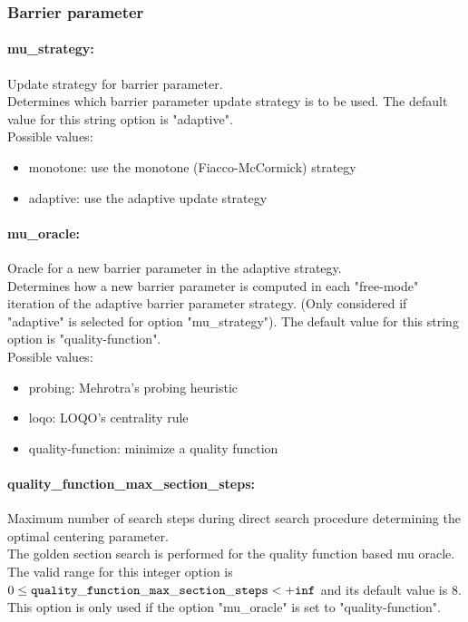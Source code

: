 \subsubsection{Barrier parameter}

\paragraph{mu\_strategy:} Update strategy for barrier parameter. $\;$ \\
 Determines which barrier parameter update
strategy is to be used.
The default value for this string option is "adaptive".
\\ 
Possible values:
\begin{itemize}
   \item monotone: use the monotone (Fiacco-McCormick) strategy
   \item adaptive: use the adaptive update strategy
\end{itemize}

\paragraph{mu\_oracle:} Oracle for a new barrier parameter in the adaptive strategy. $\;$ \\
 Determines how a new barrier parameter is
computed in each "free-mode" iteration of the
adaptive barrier parameter strategy. (Only
considered if "adaptive" is selected for option
"mu\_strategy").
The default value for this string option is "quality-function".
\\ 
Possible values:
\begin{itemize}
   \item probing: Mehrotra's probing heuristic
   \item loqo: LOQO's centrality rule
   \item quality-function: minimize a quality function
\end{itemize}

\paragraph{quality\_function\_max\_section\_steps:} Maximum number of search steps during direct search procedure determining the optimal centering parameter. $\;$ \\
 The golden section search is performed for the
quality function based mu oracle. The valid range for this integer option is
$0 \le {\tt quality\_function\_max\_section\_steps } <  {\tt +inf}$
and its default value is $8$.
This option is only used if the option "mu\_oracle" is set to "quality-function".


